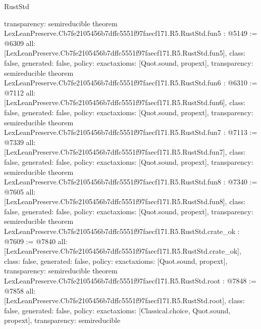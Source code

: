 \begin{lexlean}{RustStd}
\begin{coremodule}
{  transparency: semireducible
}
theorem LexLeanPreserve.Cb7fe2105456b7dffc5551f97faecf171.R5.RustStd.fun5 : @5149 := @6309 {
  all: [LexLeanPreserve.Cb7fe2105456b7dffc5551f97faecf171.R5.RustStd.fun5],
  class: false,
  generated: false,
  policy: exact{axioms: [Quot.sound, propext]},
  transparency: semireducible
}
theorem LexLeanPreserve.Cb7fe2105456b7dffc5551f97faecf171.R5.RustStd.fun6 : @6310 := @7112 {
  all: [LexLeanPreserve.Cb7fe2105456b7dffc5551f97faecf171.R5.RustStd.fun6],
  class: false,
  generated: false,
  policy: exact{axioms: [Quot.sound, propext]},
  transparency: semireducible
}
theorem LexLeanPreserve.Cb7fe2105456b7dffc5551f97faecf171.R5.RustStd.fun7 : @7113 := @7339 {
  all: [LexLeanPreserve.Cb7fe2105456b7dffc5551f97faecf171.R5.RustStd.fun7],
  class: false,
  generated: false,
  policy: exact{axioms: [Quot.sound, propext]},
  transparency: semireducible
}
theorem LexLeanPreserve.Cb7fe2105456b7dffc5551f97faecf171.R5.RustStd.fun8 : @7340 := @7605 {
  all: [LexLeanPreserve.Cb7fe2105456b7dffc5551f97faecf171.R5.RustStd.fun8],
  class: false,
  generated: false,
  policy: exact{axioms: [Quot.sound, propext]},
  transparency: semireducible
}
theorem LexLeanPreserve.Cb7fe2105456b7dffc5551f97faecf171.R5.RustStd.crate_ok : @7609 := @7840 {
  all: [LexLeanPreserve.Cb7fe2105456b7dffc5551f97faecf171.R5.RustStd.crate_ok],
  class: false,
  generated: false,
  policy: exact{axioms: [Quot.sound, propext]},
  transparency: semireducible
}
theorem LexLeanPreserve.Cb7fe2105456b7dffc5551f97faecf171.R5.RustStd.root : @7848 := @7858 {
  all: [LexLeanPreserve.Cb7fe2105456b7dffc5551f97faecf171.R5.RustStd.root],
  class: false,
  generated: false,
  policy: exact{axioms: [Classical.choice, Quot.sound, propext]},
  transparency: semireducible
}


\end{coremodule}
\end{lexlean}
